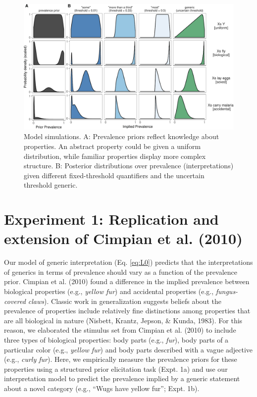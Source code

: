 \documentclass[floatsintext,doc]{apa6}
\theoremstyle{definition}
\theoremstyle{definition}
\theoremstyle{definition}
\theoremstyle{remark}
\begin{document}
\begin{figure}
\centering
\includegraphics{genint_files/figure-latex/modelSimulations-1.pdf}
\caption{\label{fig:modelSimulations}Model simulations. A: Prevalence priors
reflect knowledge about properties. An abstract property could be given
a uniform distribution, while familiar properties display more complex
structure. B: Posterior distributions over prevalence (interpretations)
given different fixed-threshold quantifiers and the uncertain threshold
generic.}
\end{figure}

\section{Experiment 1: Replication and extension of Cimpian et al.
(2010)}\label{experiment-1-replication-and-extension-of-cimpian-et-al.-2010}

Our model of generic interpretation (Eq. \ref{eq:L0}) predicts that the
interpretations of generics in terms of prevalence should vary as a
function of the prevalence prior. Cimpian et al. (2010) found a
difference in the implied prevalence between biological properties
(e.g., \emph{yellow fur}) and accidental properties (e.g.,
\emph{fungus-covered claws}). Classic work in generalization suggests
beliefs about the prevalence of properties include relatively fine
distinctions among properties that are all biological in nature
(Nisbett, Krantz, Jepson, \& Kunda, 1983). For this reason, we
elaborated the stimulus set from Cimpian et al. (2010) to include three
types of biological properties: body parts (e.g., \emph{fur}), body
parts of a particular color (e.g., \emph{yellow fur}) and body parts
described with a vague adjective (e.g., \emph{curly fur}). Here, we
empirically measure the prevalence priors for these properties using a structured prior
elicitation task (Expt. 1a) and use our interpretation model to predict
the prevalence implied by a generic statement about a novel category
(e.g., \enquote{Wugs have yellow fur}; Expt. 1b).
\end{document}
